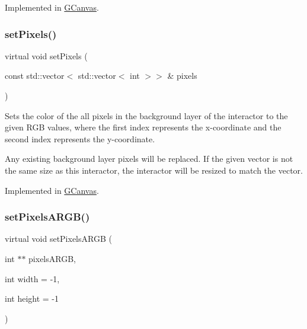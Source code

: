 Implemented in \mbox{\hyperlink{classsgl_1_1GCanvas_a9c29e6db2b5cae836612d932f7ef7146}{G\+Canvas}}.

\mbox{\label{classsgl_1_1GDrawingSurface_a2c6a1d92542ef94306ea5dbcc11c8fdb}} 
\subsubsection{\texorpdfstring{set\+Pixels()}{setPixels()}\hspace{0.1cm}{\footnotesize\ttfamily [2/2]}}
{\footnotesize\ttfamily virtual void set\+Pixels (\begin{DoxyParamCaption}\item[{const std\+::vector$<$ std\+::vector$<$ int $>$$>$ \&}]{pixels }\end{DoxyParamCaption})\hspace{0.3cm}{\ttfamily [pure virtual]}}



Sets the color of the all pixels in the background layer of the interactor to the given R\+GB values, where the first index represents the x-\/coordinate and the second index represents the y-\/coordinate. 

Any existing background layer pixels will be replaced. If the given vector is not the same size as this interactor, the interactor will be resized to match the vector. 

Implemented in \mbox{\hyperlink{classsgl_1_1GCanvas_afa5e481700ddb87860c4efd815db9ab2}{G\+Canvas}}.

\mbox{\label{classsgl_1_1GDrawingSurface_a6d30ea30c0de2b983909be1438003ff1}} 
\subsubsection{\texorpdfstring{set\+Pixels\+A\+R\+G\+B()}{setPixelsARGB()}\hspace{0.1cm}{\footnotesize\ttfamily [1/2]}}
{\footnotesize\ttfamily virtual void set\+Pixels\+A\+R\+GB (\begin{DoxyParamCaption}\item[{int $\ast$$\ast$}]{pixels\+A\+R\+GB,  }\item[{int}]{width = {\ttfamily -\/1},  }\item[{int}]{height = {\ttfamily -\/1} }\end{DoxyParamCaption})\hspace{0.3cm}{\ttfamily [pure virtual]}}



